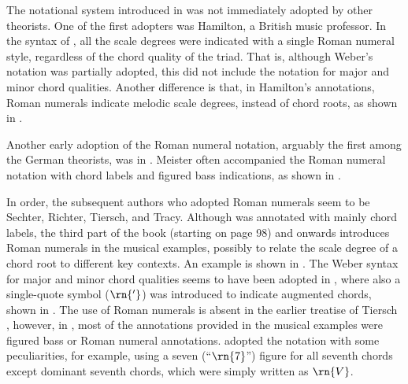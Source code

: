 


The notational system introduced in
\textcite{weber1817versuch} was not immediately adopted by
other theorists. One of the first adopters was Hamilton, a
British music professor. In the syntax of
\textcite{hamilton1840catechism}, all the scale degrees were
indicated with a single Roman numeral style, regardless of
the chord quality of the triad. That is, although Weber's
notation was partially adopted, this did not include the
notation for major and minor chord qualities. Another
difference is that, in Hamilton's annotations, Roman
numerals indicate melodic scale degrees, instead of chord
roots, as shown in
.

Another early adoption of the Roman numeral notation,
arguably the first among the German theorists, was in
\textcite{meister1852vollstandige}. Meister often
accompanied the Roman numeral notation with chord labels and
figured bass indications, as shown in
.


In order, the subsequent authors who adopted Roman numerals
seem to be Sechter, Richter, Tiersch, and Tracy. Although
\textcite{sechter1853grundsatze} was annotated with mainly
chord labels, the third part of the book (starting on page
98) and onwards introduces Roman numerals in the musical
examples, possibly to relate the scale degree of a chord
root to different key contexts. An example is shown in
. The Weber
syntax for major and minor chord qualities seems to have
been adopted in \textcite{richter1860lehrbuch}, where also a
single-quote symbol ($\rn{'}$) was introduced to indicate
augmented chords, shown in
. The use of
Roman numerals is absent in the earlier treatise of Tiersch
\parencite{tiersch1868system}, however,  in
\textcite{tiersch1874elementarbuch}, most of the annotations
provided in the musical examples were figured bass or Roman
numeral annotations. \textcite{tracy1878theory} adopted the
notation with some peculiarities, for example, using a seven
(``$\rn{7}$'') figure for all seventh chords except dominant
seventh chords, which were simply written as $\rn{V}$.

